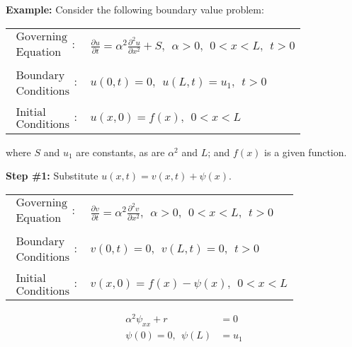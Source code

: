 \vspace{0.25cm}

\noindent\textbf{Example:}  Consider the following boundary value problem:
\begin{table}
\begin{tabular}{l l}
$\substack{\text{Governing} \\\text{Equation}}: $& $\frac{\partial u}{\partial t} = \alpha^2 \frac{\partial^2 u}{\partial x^2} + S, \ \ \alpha>0, \ \ 0<x<L, \ \ t>0$ \\
& \\
$\substack{\text{Boundary} \\ \text{Conditions}}: $& $u(0,t)=0, \ \ u(L,t) = u_1, \ \ t>0$\\
& \\
$\substack{\text{Initial} \\ \text{Conditions}}: $ & $u(x,0) = f(x), \ \ 0<x<L $ \\
\end{tabular}
\end{table}
where $S$ and $u_1$ are constants, as are $\alpha^2$ and $L$; and $f(x)$ is a given function.

\vspace{0.25cm}

\noindent\textbf{Step \#1:} Substitute $u(x,t) = v(x,t) + \psi(x)$.
\begin{table}[h!]
\begin{tabular}{l l}
$\substack{\text{Governing} \\\text{Equation}}: $& $\frac{\partial v}{\partial t} = \alpha^2 \frac{\partial^2 v}{\partial x^2}, \ \ \alpha>0, \ \ 0<x<L, \ \ t>0$ \\
& \\
$\substack{\text{Boundary} \\ \text{Conditions}}: $& $v(0,t)=0, \ \ v(L,t) = 0, \ \ t>0$\\
& \\
$\substack{\text{Initial} \\ \text{Conditions}}: $ & $v(x,0) = f(x)-\psi(x), \ \ 0<x<L $ \\
\end{tabular}
\end{table}

\begin{align*}
\alpha^2 \psi_{xx} + r &= 0 \\
\psi(0) = 0, \ \ \psi(L) &= u_1
\end{align*}

\vspace{0.25cm}

